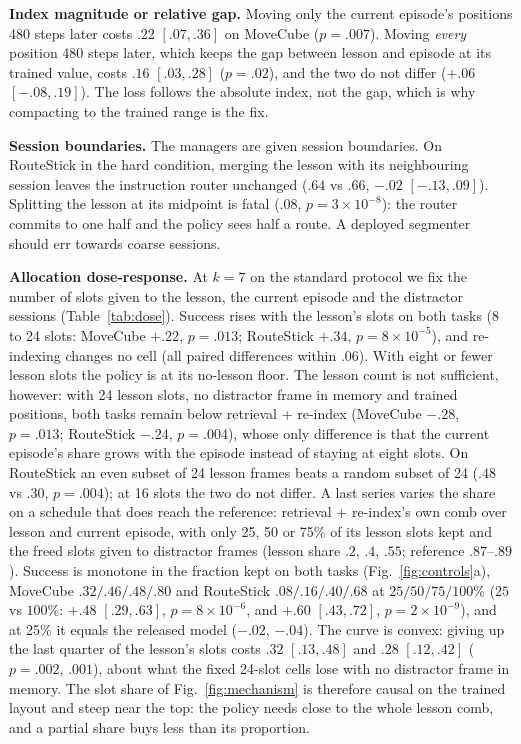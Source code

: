 \textbf{Index magnitude or relative gap.} Moving only the current episode's positions 480 steps later costs $.22$ $[.07,.36]$ on MoveCube ($p=.007$). Moving \emph{every} position 480 steps later, which keeps the gap between lesson and episode at its trained value, costs $.16$ $[.03,.28]$ ($p=.02$), and the two do not differ ($+.06$ $[-.08,.19]$). The loss follows the absolute index, not the gap, which is why compacting to the trained range is the fix.

\textbf{Session boundaries.} The managers are given session boundaries. On RouteStick in the hard condition, merging the lesson with its neighbouring session leaves the instruction router unchanged ($.64$ vs $.66$, $-.02$ $[-.13,.09]$). Splitting the lesson at its midpoint is fatal ($.08$, $p=3\times10^{-8}$): the router commits to one half and the policy sees half a route. A deployed segmenter should err towards coarse sessions.

\textbf{Allocation dose-response.} At $k{=}7$ on the standard protocol we fix the number of slots given to the lesson, the current episode and the distractor sessions (Table~\ref{tab:dose}). Success rises with the lesson's slots on both tasks (8 to 24 slots: MoveCube $+.22$, $p=.013$; RouteStick $+.34$, $p=8\times10^{-5}$), and re-indexing changes no cell (all paired differences within $.06$). With eight or fewer lesson slots the policy is at its no-lesson floor. The lesson count is not sufficient, however: with 24 lesson slots, no distractor frame in memory and trained positions, both tasks remain below retrieval + re-index (MoveCube $-.28$, $p=.013$; RouteStick $-.24$, $p=.004$), whose only difference is that the current episode's share grows with the episode instead of staying at eight slots. On RouteStick an even subset of 24 lesson frames beats a random subset of 24 ($.48$ vs $.30$, $p=.004$); at 16 slots the two do not differ. A last series varies the share on a schedule that does reach the reference: retrieval + re-index's own comb over lesson and current episode, with only 25, 50 or 75\% of its lesson slots kept and the freed slots given to distractor frames (lesson share $.2$, $.4$, $.55$; reference $.87$--$.89$). Success is monotone in the fraction kept on both tasks (Fig.~\ref{fig:controls}a), MoveCube $.32/.46/.48/.80$ and RouteStick $.08/.16/.40/.68$ at $25/50/75/100\%$ ($25$ vs $100\%$: $+.48$ $[.29,.63]$, $p=8\times10^{-6}$, and $+.60$ $[.43,.72]$, $p=2\times10^{-9}$), and at 25\% it equals the released model ($-.02$, $-.04$). The curve is convex: giving up the last quarter of the lesson's slots costs $.32$ $[.13,.48]$ and $.28$ $[.12,.42]$ ($p=.002$, $.001$), about what the fixed 24-slot cells lose with no distractor frame in memory. The slot share of Fig.~\ref{fig:mechanism} is therefore causal on the trained layout and steep near the top: the policy needs close to the whole lesson comb, and a partial share buys less than its proportion.

